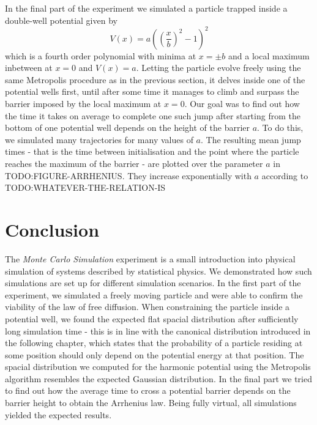 \documentclass[
    parskip=half, 
    twoside=false,
    twocolumn=true,
    fontsize=11pt,
]{scrarticle}
\begin{document}
In the final part of the experiment we simulated a particle trapped inside a double-well potential given by
\begin{equation}
 V(x) = a\left(\left(\frac{x}{b}\right)^2-1\right)^2
\end{equation}
which is a fourth order polynomial with minima at $x=\pm b$ and a local maximum inbetween at $x=0$ and $V(x)=a$. Letting the particle evolve freely using the same Metropolis procedure as in the previous section, it delves inside one of the potential wells first, until after some time it manages to climb and surpass the barrier imposed by the local maximum at $x=0$. Our goal was to find out how the time it takes on average to complete one such jump after starting from the bottom of one potential well depends on the height of the barrier $a$. To do this, we simulated many trajectories for many values of $a$. The resulting mean jump times - that is the time between initialisation and the point where the particle reaches the maximum of the barrier - are plotted over the parameter $a$ in TODO:FIGURE-ARRHENIUS. They increase exponentially with $a$ according to TODO:WHATEVER-THE-RELATION-IS

\pagebreak
\section{Conclusion}

The \textit{Monte Carlo Simulation} experiment is a small introduction into physical simulation of systems described by statistical physics. We demonstrated how such simulations are set up for different simulation scenarios. In the first part of the experiment, we simulated a freely moving particle and were able to confirm the viability of the law of free diffusion. When constraining the particle inside a potential well, we found the expected flat spacial distribution after sufficiently long simulation time - this is in line with the canonical distribution introduced in the following chapter, which states that the probability of a particle residing at some position should only depend on the potential energy at that position. The spacial distribution we computed for the harmonic potential using the Metropolis algorithm resembles the expected Gaussian distribution. In the final part we tried to find out how the average time to cross a potential barrier depends on the barrier height to obtain the Arrhenius law. Being fully virtual, all simulations yielded the expected results.

\nocite{*}
\printbibliography
\end{document}
